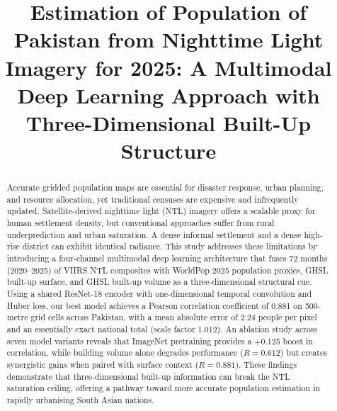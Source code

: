 \documentclass[conference]{IEEEtran}
\begin{document}
\title{Estimation of Population of Pakistan from Nighttime Light Imagery for 2025: A Multimodal Deep Learning Approach with Three-Dimensional Built-Up Structure}

\author{
    \and
    \and
}

\maketitle

\begin{abstract}
Accurate gridded population maps are essential for disaster response, urban planning, and resource allocation, yet traditional censuses are expensive and infrequently updated. Satellite-derived nighttime light (NTL) imagery offers a scalable proxy for human settlement density, but conventional approaches suffer from rural underprediction and urban saturation. A dense informal settlement and a dense high-rise district can exhibit identical radiance. This study addresses these limitations by introducing a four-channel multimodal deep learning architecture that fuses 72 months (2020--2025) of VIIRS NTL composites with WorldPop 2025 population proxies, GHSL built-up surface, and GHSL built-up volume as a three-dimensional structural cue. Using a shared ResNet-18 encoder with one-dimensional temporal convolution and Huber loss, our best model achieves a Pearson correlation coefficient of 0.881 on 500-metre grid cells across Pakistan, with a mean absolute error of 2.24 people per pixel and an essentially exact national total (scale factor 1.012). An ablation study across seven model variants reveals that ImageNet pretraining provides a +0.125 boost in correlation, while building volume alone degrades performance ($R = 0.612$) but creates synergistic gains when paired with surface context ($R = 0.881$). These findings demonstrate that three-dimensional built-up information can break the NTL saturation ceiling, offering a pathway toward more accurate population estimation in rapidly urbanising South Asian nations.
\end{abstract}
\end{document}

